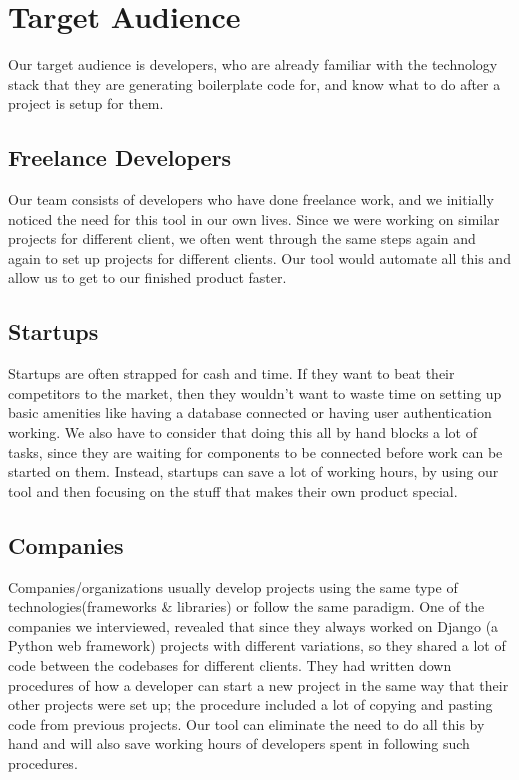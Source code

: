 \section{Target Audience}
Our target audience is developers, who are already familiar with the technology stack that they are generating boilerplate code for, and know what to do after a project is setup for them.

\subsection{Freelance Developers}
Our team consists of developers who have done freelance work, and we initially noticed the need for this tool in our own lives. Since we were working on similar projects for different client, we often went through the same steps again and again to set up projects for different clients. Our tool would automate all this and allow us to get to our finished product faster.

\subsection{Startups}
Startups are often strapped for cash and time. If they want to beat their competitors to the market, then they wouldn't want to waste time on setting up basic amenities like having a database connected or having user authentication working. We also have to consider that doing this all by hand blocks a lot of tasks, since they are waiting for components to be connected before work can be started on them. Instead, startups can save a lot of working hours, by using our tool and then focusing on the stuff that makes their own product special.

\subsection{Companies}
Companies/organizations usually develop projects using the same type of technologies(frameworks & libraries) or follow the same paradigm. One of the companies we interviewed, revealed that since they always worked on Django (a Python web framework) projects with different variations, so they shared a lot of code between the codebases for different clients. They had written down procedures of how a developer can start a new project in the same way that their other projects were set up; the procedure included a lot of copying and pasting code from previous projects. Our tool can eliminate the need to do all this by hand and will also save working hours of developers spent in following such procedures.

